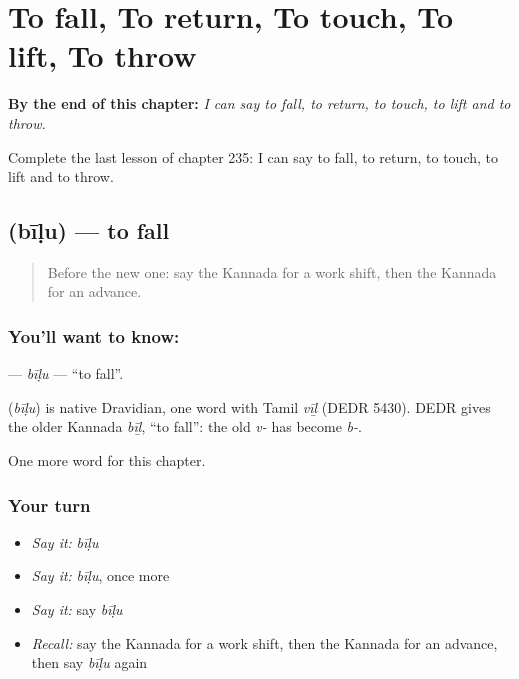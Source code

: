 
\chapter{To fall, To return, To touch, To lift, To throw}
\label{ch:ka-to-fall-to-return-to-touch-to-lift-to-throw}

\begin{chapteropening}
\textbf{By the end of this chapter:} \emph{I can say to fall, to return, to touch, to lift and to throw.}

Complete the last lesson of chapter 235: I can say to fall, to return, to touch, to lift and to throw.
\end{chapteropening}

\section[\texorpdfstring{\kn{ಬೀಳು} (bīḷu)}{ಬೀಳು (bīḷu)}]{ (bīḷu) — to fall}

\label{lesson:KA-C235-bilu}



\begin{quote}
Before the new one: say the Kannada for a work shift, then the Kannada for an advance.
\end{quote}

\subsection*{You'll want to know: }
\textbf{} — \emph{bīḷu} — \textquotedblleft{}to fall\textquotedblright{}.

\begin{cousinweb}
\textbf{} (\emph{bīḷu}) is native Dravidian, one word with Tamil \emph{vīḻ} (DEDR 5430). DEDR gives the older Kannada \emph{bīḻ}, \textquotedblleft{}to fall\textquotedblright{}: the old \emph{v-} has become \emph{b-}.
\end{cousinweb}

\begin{grammarlens}[title={What you've built}]
One more word for this chapter.
\end{grammarlens}

\subsection*{Your turn}
\begin{itemize}
\raggedright
  \item \emph{Say it:} \emph{bīḷu}
  \item \emph{Say it:} \emph{bīḷu}, once more
  \item \emph{Say it:} say \emph{bīḷu}
  \item \emph{Recall:} say the Kannada for a work shift, then the Kannada for an advance, then say \emph{bīḷu} again
\end{itemize}


